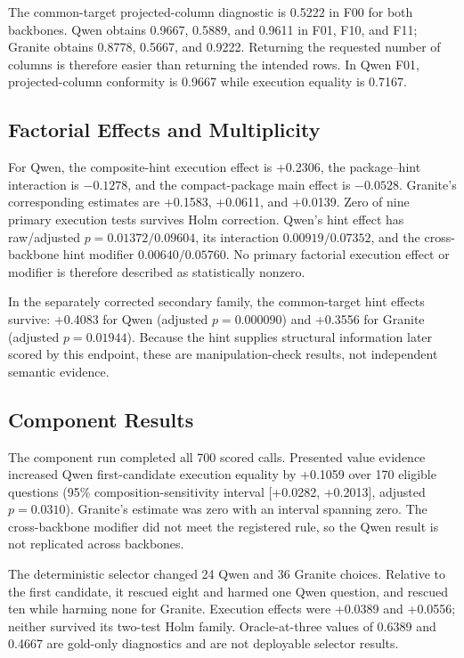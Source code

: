 \documentclass[applsci,article,submit,moreauthors]{Definitions/mdpi}
\begin{document}
The common-target projected-column diagnostic is 0.5222 in F00 for both backbones. Qwen obtains 0.9667, 0.5889, and 0.9611 in F01, F10, and F11; Granite obtains 0.8778, 0.5667, and 0.9222. Returning the requested number of columns is therefore easier than returning the intended rows. In Qwen F01, projected-column conformity is 0.9667 while execution equality is 0.7167.

\subsection{Factorial Effects and Multiplicity}

For Qwen, the composite-hint execution effect is +0.2306, the package--hint interaction is $-0.1278$, and the compact-package main effect is $-0.0528$. Granite's corresponding estimates are +0.1583, +0.0611, and +0.0139. Zero of nine primary execution tests survives Holm correction. Qwen's hint effect has raw/adjusted $p=0.01372/0.09604$, its interaction $0.00919/0.07352$, and the cross-backbone hint modifier $0.00640/0.05760$. No primary factorial execution effect or modifier is therefore described as statistically nonzero.

In the separately corrected secondary family, the common-target hint effects survive: +0.4083 for Qwen (adjusted $p=0.000090$) and +0.3556 for Granite (adjusted $p=0.01944$). Because the hint supplies structural information later scored by this endpoint, these are manipulation-check results, not independent semantic evidence.

\subsection{Component Results}

The component run completed all 700 scored calls. Presented value evidence increased Qwen first-candidate execution equality by +0.1059 over 170 eligible questions (95\% composition-sensitivity interval [+0.0282, +0.2013], adjusted $p=0.0310$). Granite's estimate was zero with an interval spanning zero. The cross-backbone modifier did not meet the registered rule, so the Qwen result is not replicated across backbones.

The deterministic selector changed 24 Qwen and 36 Granite choices. Relative to the first candidate, it rescued eight and harmed one Qwen question, and rescued ten while harming none for Granite. Execution effects were +0.0389 and +0.0556; neither survived its two-test Holm family. Oracle-at-three values of 0.6389 and 0.4667 are gold-only diagnostics and are not deployable selector results.
\end{document}
